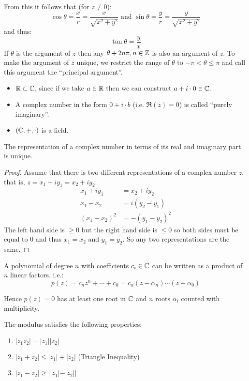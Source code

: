 \documentclass[../main.tex]{subfiles}
\begin{document}
From this it follows that (for $z \neq 0$):
\[
  \cos \theta = \frac{x}{r} = \frac{x}{\sqrt{x^2 + y^2}}\text{ and }\sin \theta = \frac{y}{r} = \frac{y}{\sqrt{x^2 + y^2}}
\]
and thus:
\[
  \tan \theta = \frac{y}{x}
\]
If $\theta$ is the argument of $z$ then any $\theta + 2n\pi, n \in \mathbb{Z}$ is also an argument of $z$.
To make the argument of $z$ unique, we restrict the range of $\theta$ to $-\pi < \theta \leq \pi$ and call this argument the ``principal argument''.
\begin{remark}
  \begin{itemize}
    \item $\mathbb{R} \subset \mathbb{C}$, since if we take $a \in \mathbb{R}$ then we can construct $a + i \cdot 0 \in \mathbb{C}$.
    \item A complex number in the form $0 + i \cdot b$ (i.e. $\Re(z) = 0$) is called ``purely imaginary''.
    \item $(\mathbb{C}, +, \cdot)$ is a field.
  \end{itemize}
\end{remark}
\begin{proposition}
  The representation of a complex number in terms of its real and imaginary part is unique.
\end{proposition}
\begin{proof}
  Assume that there is two different representations of a complex number $z$, that is, $z = x_1 + iy_1 = x_2 + iy_2$.
  \begin{align*}
    x_1 + iy_1 &= x_2 + iy_2 \\
    x_1 - x_2 &= i(y_2 - y_1) \\
    (x_1 - x_2)^2 &= -(y_1 - y_2)^2
  \end{align*}
  The left hand side is $\geq 0$ but the right hand side is $\leq 0$ so both sides must be equal to 0 and thus $x_1 = x_2$ and $y_1 = y_2$.
  So any two representations are the same.
\end{proof}
\begin{theorem}
  A polynomial of degree $n$ with coefficients $c_i \in \mathbb{C}$ can be written as a product of $n$ linear factors. i.e.:
  \[
    p(z) = c_n z^n + \cdots + c_0 = c_n(z - \alpha_n) \cdots (z - \alpha_0)
  \]
\end{theorem}
Hence $p(z) = 0$ has at least one root in $\mathbb{C}$ and $n$ roots $\alpha_i$ counted with multiplicity.
\begin{proposition}
  The modulus satisfies the following properties:
  \begin{enumerate}
    \item $|z_1 z_2| = |z_1||z_2|$
    \item $|z_1 + z_2| \leq |z_1| + |z_2|$ (Triangle Inequality)
    \item $|z_1 - z_2| \geq ||z_1| - |z_2||$
  \end{enumerate}
\end{proposition}
\end{document}
